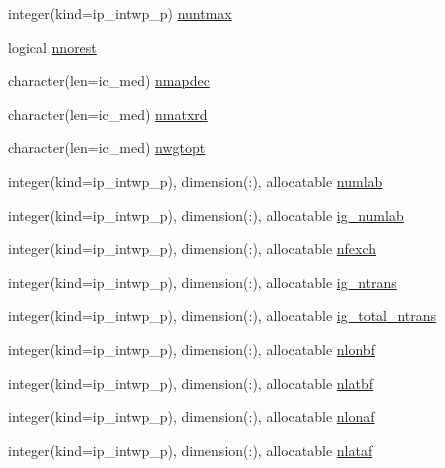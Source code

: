 \begin{DoxyCompactItemize}
\item 
integer(kind=ip\+\_\+intwp\+\_\+p) \hyperlink{namespacemod__oasis__namcouple_ab47490a015fa09cf75a760dadfeb0ff9}{nuntmax}
\item 
logical \hyperlink{namespacemod__oasis__namcouple_adb02545191d2ca9c1daff1a3ced2223f}{nnorest}
\item 
character(len=ic\+\_\+med) \hyperlink{namespacemod__oasis__namcouple_af56d31837b48a43e234bccbf1a3e2954}{nmapdec}
\item 
character(len=ic\+\_\+med) \hyperlink{namespacemod__oasis__namcouple_a7cb9d88a57224d84d97afc29b0e606bf}{nmatxrd}
\item 
character(len=ic\+\_\+med) \hyperlink{namespacemod__oasis__namcouple_ad7829e2434eb8214b599ba49395c9fc5}{nwgtopt}
\item 
integer(kind=ip\+\_\+intwp\+\_\+p), dimension(\+:), allocatable \hyperlink{namespacemod__oasis__namcouple_a12e1621f5697a0cdbde11d3e25f43b54}{numlab}
\item 
integer(kind=ip\+\_\+intwp\+\_\+p), dimension(\+:), allocatable \hyperlink{namespacemod__oasis__namcouple_ab0b9a7822ec44010e8652ed2d6abc0db}{ig\+\_\+numlab}
\item 
integer(kind=ip\+\_\+intwp\+\_\+p), dimension(\+:), allocatable \hyperlink{namespacemod__oasis__namcouple_ac6216c78a2779e49f90a9a95a39c27d7}{nfexch}
\item 
integer(kind=ip\+\_\+intwp\+\_\+p), dimension(\+:), allocatable \hyperlink{namespacemod__oasis__namcouple_ac4549f9f5bbb37fce3edc9a208e0d48b}{ig\+\_\+ntrans}
\item 
integer(kind=ip\+\_\+intwp\+\_\+p), dimension(\+:), allocatable \hyperlink{namespacemod__oasis__namcouple_abbd7bd184bb2a3860063dbb9f109f427}{ig\+\_\+total\+\_\+ntrans}
\item 
integer(kind=ip\+\_\+intwp\+\_\+p), dimension(\+:), allocatable \hyperlink{namespacemod__oasis__namcouple_a6e774d31f16b513b1d604e72a82dff40}{nlonbf}
\item 
integer(kind=ip\+\_\+intwp\+\_\+p), dimension(\+:), allocatable \hyperlink{namespacemod__oasis__namcouple_a9b09ac96dad78313003a9436fe2f9aec}{nlatbf}
\item 
integer(kind=ip\+\_\+intwp\+\_\+p), dimension(\+:), allocatable \hyperlink{namespacemod__oasis__namcouple_ae413f2dc402b7c018e341081b8d6e208}{nlonaf}
\item 
integer(kind=ip\+\_\+intwp\+\_\+p), dimension(\+:), allocatable \hyperlink{namespacemod__oasis__namcouple_a80d81b2f026a2d0dc2de27b9ee04f7af}{nlataf}
\item 

\end{DoxyCompactItemize}
